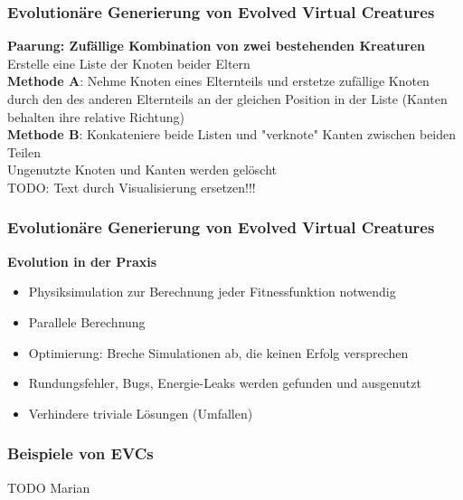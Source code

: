 \documentclass{beamer}
\begin{document}
\begin{frame}
	\frametitle{Evolutionäre Generierung von Evolved Virtual Creatures}
	
	\textbf{Paarung: Zufällige Kombination von zwei bestehenden Kreaturen} \\
	Erstelle eine Liste der Knoten beider Eltern \\
	\vspace{1em}
	\textbf{Methode A}: Nehme Knoten eines Elternteils und erstetze zufällige Knoten durch den des anderen Elternteils an der gleichen Position in der Liste (Kanten behalten ihre relative Richtung) \\
	\vspace{1em}
	\textbf{Methode B}: Konkateniere beide Listen und "verknote" Kanten zwischen beiden Teilen \\
	\vspace{2em}
	Ungenutzte Knoten und Kanten werden gelöscht \\
	\vspace{2em}
	TODO: Text durch Visualisierung ersetzen!!!
\end{frame}

\begin{frame}
	\frametitle{Evolutionäre Generierung von Evolved Virtual Creatures}
	
	\textbf{Evolution in der Praxis}
	\begin{itemize}
		\item Physiksimulation zur Berechnung jeder Fitnessfunktion notwendig
		\item Parallele Berechnung
		\item Optimierung: Breche Simulationen ab, die keinen Erfolg versprechen
		\item Rundungsfehler, Bugs, Energie-Leaks werden gefunden und ausgenutzt
		\item Verhindere triviale Lösungen (Umfallen)
	\end{itemize}
\end{frame}

\begin{frame}
	\frametitle{Beispiele von EVCs}
	
	TODO Marian
\end{frame}
\end{document}
